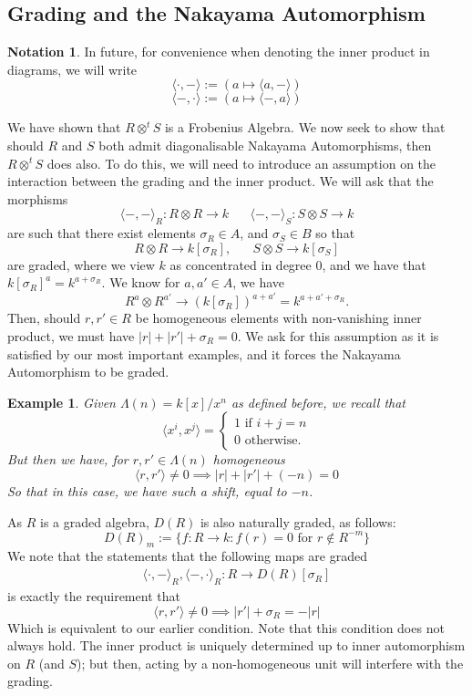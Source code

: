 \documentclass{article}
\theoremstyle{plain}
\newtheorem{examples}[theorem]{Example}
\theoremstyle{definition}
\newtheorem{notation}[theorem]{Notation}
\begin{document}
\subsection{Grading and the Nakayama Automorphism}
\begin{notation} In future, for convenience when denoting the inner product in diagrams, we will write
$$\langle \cdot, - \rangle:= ( a \mapsto \langle a, - \rangle )$$
$$\langle -, \cdot \rangle:= ( a \mapsto \langle -, a \rangle ) $$
\end{notation}
We have shown that $R \otimes^t S$ is a Frobenius Algebra. We now seek to show that should $R$ and $S$ both admit diagonalisable Nakayama Automorphisms, then $R \otimes^t S$ does also. To do this, we will need to introduce an assumption on the interaction between the grading and the inner product. We will ask that the morphisms
$$\langle - ,- \rangle_R : R \otimes R \rightarrow k \hspace{20pt} \langle -,- \rangle_S: S \otimes S \rightarrow k$$
are such that there exist elements $\sigma_R \in A$, and $\sigma_S \in B$ so that
$$R \otimes R \rightarrow k[\sigma_R], \hspace{20pt} S \otimes S \rightarrow k[\sigma_S]$$
are graded, where we view $k$ as concentrated in degree $0$, and we have that $k[\sigma_R]^{a} =k^{a+\sigma_R}$. We know for $a, a' \in A$, we have
$$R^a \otimes R^{a'} \rightarrow (k[\sigma_R])^{a+a'}=k^{a+a'+\sigma_R}.$$
Then, should $r, r'\in R$ be homogeneous elements with non-vanishing inner product, we must have $|r|+|r'|+\sigma_R=0$. We ask for this assumption as it is satisfied by our most important examples, and it forces the Nakayama Automorphism to be graded.
\begin{examples} 
Given $\Lambda(n)=k[x]/x^n$ as defined before, we recall that
$$\langle x^i, x^j \rangle = \begin{cases} 1 \textrm{ if } i+j=n \\ 0 \textrm{ otherwise. } \end{cases}$$
But then we have, for $r,r' \in \Lambda(n)$ homogeneous 
$$\langle r, r' \rangle \not= 0 \implies |r|+|r'|+(-n)=0$$
So that in this case, we have such a shift, equal to $-n$. 
\end{examples}
As $R$ is a graded algebra, $D(R)$ is also naturally graded, as follows:
$$D(R)_m := \{ f : R \rightarrow k: f(r) =0 \textrm{ for } r \not \in R^{-m}\}$$
We note that the statements that the following maps are graded
$$\begin{aligned} \langle \cdot, - \rangle_R, \langle -, \cdot \rangle_R : R \rightarrow D(R)[\sigma_R] \end{aligned}$$
is exactly the requirement that
$$\langle r, r' \rangle \not= 0 \implies |r'|+\sigma_R =-|r|$$
Which is equivalent to our earlier condition. Note that this condition does not always hold. The inner product is uniquely determined up to inner automorphism on $R$ (and $S$); but then, acting by  a non-homogeneous unit will interfere with the grading. \\
\end{document}
